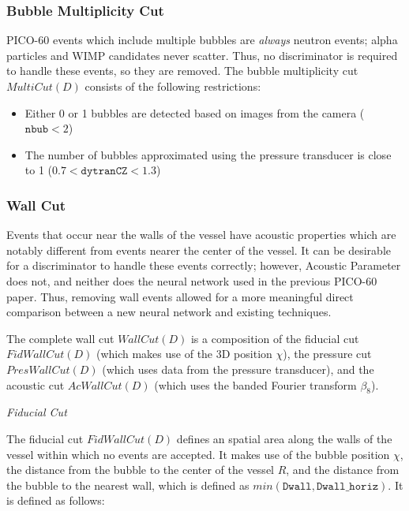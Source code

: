 \documentclass[10pt]{article}
\begin{document}
\subsubsection{Bubble Multiplicity Cut}

PICO-60 events which include multiple bubbles are \textit{always} neutron events; alpha particles and WIMP candidates never scatter. Thus, no discriminator is required to handle these events, so they are removed. The bubble multiplicity cut $MultiCut(D)$ consists of the following restrictions:

\begin{itemize}
    \item Either 0 or 1 bubbles are detected based on images from the camera ($\texttt{nbub}<2$)
    \item The number of bubbles approximated using the pressure transducer is close to 1 ($0.7<\texttt{dytranCZ}<1.3$)
\end{itemize}

\subsubsection{Wall Cut}

Events that occur near the walls of the vessel have acoustic properties which are notably different from events nearer the center of the vessel. It can be desirable for a discriminator to handle these events correctly; however, Acoustic Parameter does not, and neither does the neural network used in the previous PICO-60 paper. Thus, removing wall events allowed for a more meaningful direct comparison between a new neural network and existing techniques.

The complete wall cut $WallCut(D)$ is a composition of the fiducial cut $FidWallCut(D)$ (which makes use of the 3D position $\chi$), the pressure cut $PresWallCut(D)$ (which uses data from the pressure transducer), and the acoustic cut $AcWallCut(D)$ (which uses the banded Fourier transform $\beta _{8}$).

\textit{Fiducial Cut}

The fiducial cut $FidWallCut(D)$ defines an spatial area along the walls of the vessel within which no events are accepted. It makes use of the bubble position $\chi$, the distance from the bubble to the center of the vessel $R$, and the distance from the bubble to the nearest wall, which is defined as $min(\texttt{Dwall}, \texttt{Dwall\_horiz})$. It is defined as follows:
\end{document}
